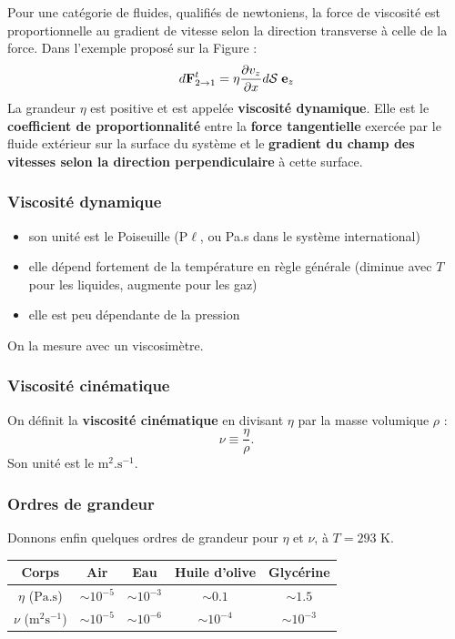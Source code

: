 \documentclass[11pt,a4paper]{report}
\begin{document}
Pour une catégorie de fluides, qualifiés de newtoniens, la force de viscosité est proportionnelle au gradient de vitesse selon la direction transverse à celle de la force.
Dans l'exemple proposé sur la Figure :
\begin{equation}
	d\bold{F}_{2\rightarrow 1}^t = \eta \frac{\partial v_z}{\partial x} 
	d\mathcal{S}\;\bold{e}_z
	\label{eq:viscosite}
\end{equation}
La grandeur $\eta$ est positive et est appelée \textbf{viscosité dynamique}. Elle est le \textbf{coefficient de proportionnalité} entre la \textbf{force tangentielle} exercée par le fluide extérieur sur la surface du système et le \textbf{gradient du champ des vitesses selon la direction perpendiculaire} à cette surface.

\subsubsection{Viscosité dynamique}
\begin{itemize}
	\item son unité est le Poiseuille (P$\ell$, ou Pa.s dans le système international)
	\item elle dépend fortement de la température en règle générale (diminue avec $T$ pour les liquides, augmente pour les gaz)
	\item elle est peu dépendante de la pression
\end{itemize}

On la mesure avec un viscosimètre.

\subsubsection{Viscosité cinématique}
On définit la \textbf{viscosité cinématique} en divisant $\eta$ par la masse volumique $\rho$ :
\begin{equation}
	\nu \equiv \frac{\eta}{\rho}.
\end{equation}
Son unité est le $\text{m}^2.\text{s}^{-1}$.

\subsubsection{Ordres de grandeur}
Donnons enfin quelques ordres de grandeur pour $\eta$ et $\nu$, à $T = 293$ K.

\begin{center}
\begin{tabular}{|c|c|c|c|c|}
  \hline
  Corps & Air & Eau & Huile d'olive & Glycérine\\
  \hline
  $\eta$ ($\text{Pa.s}$) & $\sim 10^{-5}$ & $\sim 10^{-3}$ & $\sim 0.1$ & $\sim 1.5$\\
  \hline
  $\nu$ ($\text{m}^2\text{s}^{-1}$) & $\sim 10^{-5}$ & $\sim 10^{-6}$ & $\sim 10^{-4}$ & $\sim 10^{-3}$ \\
  \hline
\end{tabular}
\end{center}
\end{document}

